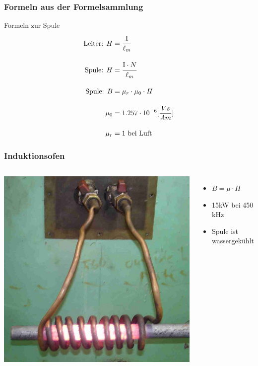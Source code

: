 \begin{frame}
    \frametitle{Formeln aus der Formelsammlung}
    \begin{block}{Formeln zur Spule}
      \begin{align*}
	\text{Leiter: } H &= \cfrac{\mathrm{I}}{\ell_m} \\[1em]
    	\text{Spule: } H &= \cfrac{\mathrm{I} \cdot N}{\ell_m} \\[1em]
	\text{Spule: } B &= \mu_r \cdot \mu_0 \cdot H \\[1em]
    	\mu_0 &= 1.257 \cdot 10^{-6}[\frac{Vs}{Am}] \\[1em]
	\mu_r &= 1 \text{ bei Luft}
     \end{align*}
   \end{block}
\end{frame}

\begin{frame}
  \frametitle{Induktionsofen}
  \begin{columns}[c]
    \includegraphics[width=\textwidth,height=.85\textheight,keepaspectratio]{a08/Induction_heating_of_bar_crop.jpg}\\
    {\tiny \hyperlink{refs}{\cite{wm}}} \\[1em]
    \begin{itemize}
      \item $B = \mu \cdot H$
      \item 15kW bei 450 kHz
      \item Spule ist wassergekühlt
    \end{itemize}
  \end{columns}
\end{frame}

